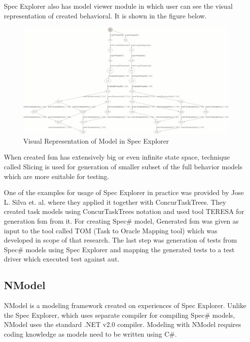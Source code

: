 \par
Spec Explorer also has model viewer module in which user can see the visual representation of created behavioral. It is shown in the figure below.

\begin{figure} [htbp!]
	\centering
					\includegraphics[width=1\textwidth]{figures/Model_View_In_SpecExplorer.png}
					\caption{\label{Fig:Model_View_In_SpecExplorer} Visual Representation of Model in Spec Explorer \cite{SpecExplorer_ModelView}}
\end{figure}

\par
When created \acrshort{fsm} has extensively big or even infinite state space, technique called Slicing is used for generation of smaller subset of the full behavior models which are more suitable for testing.

\par
One of the examples for usage of Spec Explorer in practice was provided by Jose L. Silva et. al. \cite{Silva_SpecExplorer} where they applied it together with ConcurTaskTrees. They created task models using ConcurTaskTrees notation
and used tool TERESA for generation \acrshort{fsm} from it. For creating Spec\# model, Generated \acrshort{fsm} was given as input to the tool called TOM (Task to Oracle Mapping tool) which was developed in scope of that research. The last step was generation of tests from Spec\# models using Spec Explorer and mapping the generated tests to a test driver which executed test against \acrshort{aut}.

\subsection{NModel}
\par
NModel \cite{NModel_Description} \cite{NModel_Description2} is a modeling framework created on experiences of Spec Explorer. Unlike the Spec Explorer, which uses separate compiler for compiling Spec\# models, NModel uses the standard .NET v2.0 compiler. Modeling with NModel requires coding knowledge as models need to be written using C\#.

